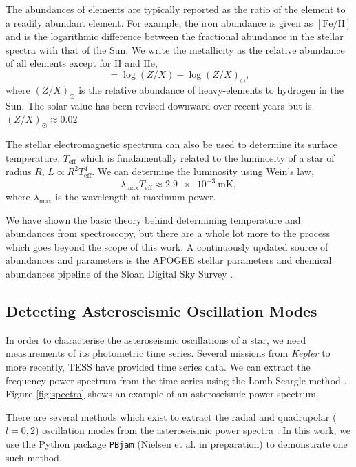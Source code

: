 The abundances of elements are typically reported as the ratio of the element to a readily abundant element. For example, the iron abundance is given as $[\mathrm{Fe/H}]$ and is the logarithmic difference between the fractional abundance in the stellar spectra with that of the Sun. We write the metallicity as the relative abundance of all elements except for H and He,
\begin{equation}
    [\mathrm{M/H}] = \log(Z/X) - \log(Z/X)_\odot,
\end{equation}
where $(Z/X)_\odot$ is the relative abundance of heavy-elements to hydrogen in the Sun. The solar value has been revised downward over recent years but is $(Z/X)_\odot \approx 0.02$ \citep{Grevesse.Sauval1998, Asplund.Grevesse.ea2005, Asplund.Grevesse.ea2009}

The stellar electromagnetic spectrum can also be used to determine its surface temperature, $T_\mathrm{eff}$ which is fundamentally related to the luminosity of a star of radius $R$, $L \propto R^2T_\mathrm{eff}^4$. We can determine the luminosity using Wein's law,
\begin{equation}
    \lambda_\mathrm{max} T_\mathrm{eff} \approx \SI{2.9e-3}{\meter\kelvin},
\end{equation}
where $\lambda_\mathrm{max}$ is the wavelength at maximum power.

We have shown the basic theory behind determining temperature and abundances from spectroscopy, but there are a whole lot more to the process which goes beyond the scope of this work. A continuously updated source of abundances and parameters is the APOGEE stellar parameters and chemical abundances pipeline \citep[ASPCAP;][]{GarciaPerez.AllendePrieto.ea2016} of the Sloan Digital Sky Survey \citep[SDSS;][]{Blanton.Bershady.ea2017}.

\subsection{Detecting Asteroseismic Oscillation Modes}

In order to characterise the asteroseismic oscillations of a star, we need measurements of its photometric time series. Several missions from \emph{Kepler} \citep{Borucki.Koch.ea2010} to more recently, TESS \citep{Ricker.Winn.ea2015} have provided time series data. We can extract the frequency-power spectrum from the time series using the Lomb-Scargle method \citep{Lomb1976, Scargle1982}. Figure \ref{fig:spectra} shows an example of an asteroseismic power spectrum. 

There are several methods which exist to extract the radial and quadrupolar ($l=0, 2$) oscillation modes from the asteroseismic power spectra \citep[see e.g.][]{Mosser.Belkacem.ea2011, Appourchaux.Chaplin.ea2012, Davies.Aguirre.ea2016}. In this work, we use the Python package \texttt{PBjam} (Nielsen et al. in preparation) to demonstrate one such method. 

